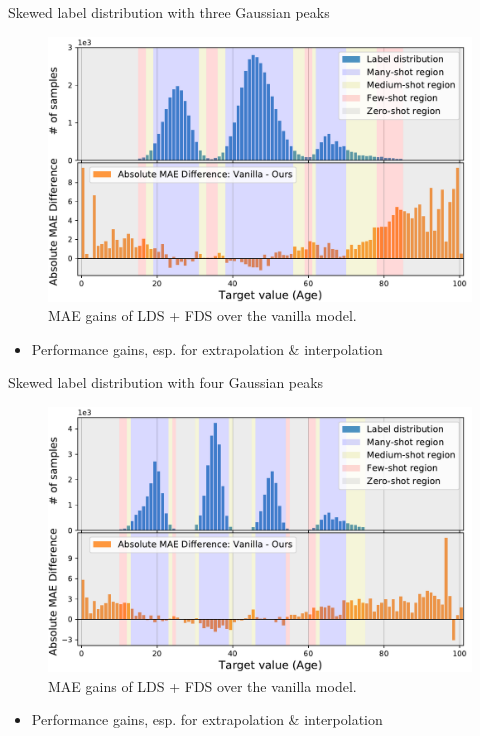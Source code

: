 \begin{frame}{Skewed label distribution with three Gaussian peaks}
	\begin{figure}[h]
		\includegraphics[width=0.7\linewidth]{images/interp_extrap_diff_peak3.pdf}
		\caption{MAE gains of LDS + FDS over the vanilla model.}
	\end{figure}
	\begin{itemize}
		\item Performance gains, esp. for extrapolation \& interpolation
	\end{itemize}
\end{frame}

\begin{frame}{Skewed label distribution with four Gaussian peaks}
	\begin{figure}[h]
		\includegraphics[width=0.7\linewidth]{images/interp_extrap_diff_peak4.pdf}
		\caption{MAE gains of LDS + FDS over the vanilla model.}
	\end{figure}
	\begin{itemize}
		\item Performance gains, esp. for extrapolation \& interpolation
	\end{itemize}
\end{frame}

